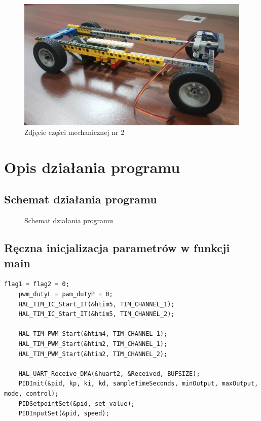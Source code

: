 \documentclass[10pt, a4paper]{article}
\begin{document}
		\begin{figure}[H]
		\centering
		\includegraphics[width=1\textwidth]{figures/20190410_135853.jpg}
		\caption{Zdjęcie części mechanicznej nr 2}
		\label{fig:Zdjęcie części mechanicznej nr 2}
	\end{figure}

\section{Opis działania programu}

\subsection{Schemat działania programu}
	\begin{figure}[H]
		\centering
		\caption{Schemat działania programu}
		\label{fig:diagramPWM}
	\end{figure}

\subsection{Ręczna inicjalizacja parametrów w funkcji main}
	\begin{lstlisting}[tabsize=2]
	flag1 = flag2 = 0;
	pwm_dutyL = pwm_dutyP = 0;
	HAL_TIM_IC_Start_IT(&htim5, TIM_CHANNEL_1);
	HAL_TIM_IC_Start_IT(&htim5, TIM_CHANNEL_2);
	
	HAL_TIM_PWM_Start(&htim4, TIM_CHANNEL_1);
	HAL_TIM_PWM_Start(&htim2, TIM_CHANNEL_1);
	HAL_TIM_PWM_Start(&htim2, TIM_CHANNEL_2);
	
	HAL_UART_Receive_DMA(&huart2, &Received, BUFSIZE);
	PIDInit(&pid, kp, ki, kd, sampleTimeSeconds, minOutput, maxOutput, mode, control);
	PIDSetpointSet(&pid, set_value);
	PIDInputSet(&pid, speed);
	\end{lstlisting}
\end{document}
